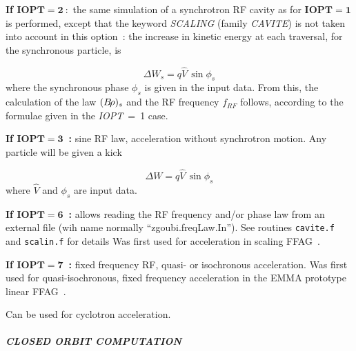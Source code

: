 \noindent\textbf{If $\mathbf{IOPT  =  2~:}$} the same simulation of a synchrotron RF cavity 
as for $\mathbf{IOPT  =  1}$ is performed, except that the keyword 
\textsl{SCALING} (family \textsl{CAVITE}) is not taken into 
account in this option~: the increase in kinetic energy at each traversal, 
for the synchronous particle, is

$$ \Delta W_s= q\hat  V \,\sin\phi_ s $$
%
where the synchronous phase $ \phi_ s $ is given in the input data.
From this, the calculation of the law $ (B\!\rho )_s $ and the RF frequency 
$f_{RF} $ follows, according to the formulae given in the \mbox{\textsl{IOPT}  =  1} case. 

\bigskip

\noindent\textbf{If $\mathbf{IOPT  =  3}$~:} sine RF law, acceleration without synchrotron motion. 
Any particle will be given a kick

$$ \Delta W = q\hat  V\, \sin\phi_ s $$
%
where $ \hat  V $ and $ \phi_ s $ are input data.  

\bigskip

\noindent\textbf{If $\mathbf{IOPT  =  6}$~:}  
allows reading the RF frequency and/or phase law from an external file (wih name normally ``zgoubi.freqLaw.In''). 
See routines \texttt{cavite.f} and \texttt{scalin.f} for details
Was first used for  acceleration  in scaling FFAG~\cite{reportNIMFFAGSPI}.   


\bigskip

\noindent\textbf{If $\mathbf{IOPT  =  7}$~:} fixed frequency RF, quasi- or isochronous acceleration. Was 
first used for quasi-isochronous, fixed frequency acceleration in the EMMA prototype 
linear FFAG~\cite{repDapniaEMMA,EMMAIPAC10}. 

\noindent Can be used for  cyclotron  acceleration. 



\bigskip

\paragraph{\textit{CLOSED ORBIT COMPUTATION}}       

\medskip

